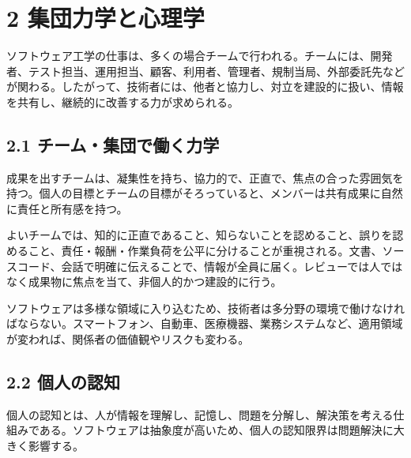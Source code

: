 \documentclass[uplatex,dvipdfmx,a4paper,11pt]{jsarticle}
\begin{document}
\section*{2 集団力学と心理学}


ソフトウェア工学の仕事は、多くの場合チームで行われる。チームには、開発者、テスト担当、運用担当、顧客、利用者、管理者、規制当局、外部委託先などが関わる。したがって、技術者には、他者と協力し、対立を建設的に扱い、情報を共有し、継続的に改善する力が求められる。

\subsection*{2.1 チーム・集団で働く力学}


成果を出すチームは、凝集性を持ち、協力的で、正直で、焦点の合った雰囲気を持つ。個人の目標とチームの目標がそろっていると、メンバーは共有成果に自然に責任と所有感を持つ。

よいチームでは、知的に正直であること、知らないことを認めること、誤りを認めること、責任・報酬・作業負荷を公平に分けることが重視される。文書、ソースコード、会話で明確に伝えることで、情報が全員に届く。レビューでは人ではなく成果物に焦点を当て、非個人的かつ建設的に行う。

ソフトウェアは多様な領域に入り込むため、技術者は多分野の環境で働けなければならない。スマートフォン、自動車、医療機器、業務システムなど、適用領域が変われば、関係者の価値観やリスクも変わる。

\subsection*{2.2 個人の認知}


個人の認知とは、人が情報を理解し、記憶し、問題を分解し、解決策を考える仕組みである。ソフトウェアは抽象度が高いため、個人の認知限界は問題解決に大きく影響する。
\end{document}
